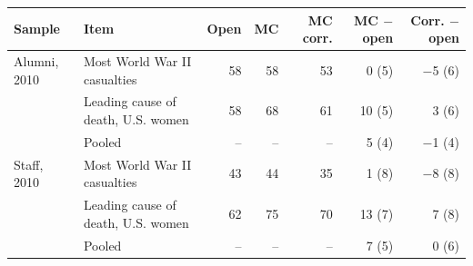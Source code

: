 \begin{tabular}{llrrrrr}
\toprule
Sample & Item & Open & MC & MC corr. & MC $-$ open & Corr. $-$ open \\
\midrule
Alumni, 2010 & Most World War II casualties & 58 & 58 & 53 & 0 (5) & $-$5 (6) \\
 & Leading cause of death, U.S. women & 58 & 68 & 61 & 10 (5) & 3 (6) \\
 & Pooled & -- & -- & -- & 5 (4) & $-$1 (4) \\
Staff, 2010 & Most World War II casualties & 43 & 44 & 35 & 1 (8) & $-$8 (8) \\
 & Leading cause of death, U.S. women & 62 & 75 & 70 & 13 (7) & 7 (8) \\
 & Pooled & -- & -- & -- & 7 (5) & 0 (6) \\
\bottomrule
\end{tabular}

